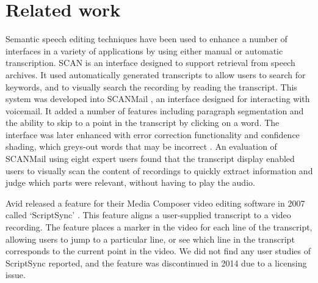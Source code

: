 \section{Related work}\label{sec:relatedwork}


Semantic speech editing techniques have been used to enhance a number of
interfaces in a variety of applications by using either manual or
automatic transcription.
SCAN \citep{Whittaker1999} is an interface designed to support retrieval from
speech archives. It used automatically generated transcripts to allow users to
search for keywords, and to visually search the recording by reading the
transcript. This system was developed into SCANMail \citep{Whittaker2002}, an
interface designed for interacting with voicemail. It added a number of
features including paragraph segmentation and the ability to skip to a point in
the transcript by clicking on a word. The interface was later enhanced with
error correction functionality and confidence shading, which greys-out words
that may be incorrect \citep{Burke2006}. An evaluation of SCANMail using eight
expert users found that the transcript display enabled users to visually scan
the content of recordings to quickly extract information and judge which
parts were relevant, without having to play the audio.

Avid released a feature for their Media Composer video editing software in 2007
called `ScriptSync' \citep{Avid2011}. This feature aligns a user-supplied
transcript to a video recording. The feature places a marker in the video for
each line of the transcript, allowing users to jump to a particular line, or
see which line in the transcript corresponds to the current point in the video.
We did not find any user studies of ScriptSync reported, and the feature was
discontinued in 2014 due to a licensing issue.

